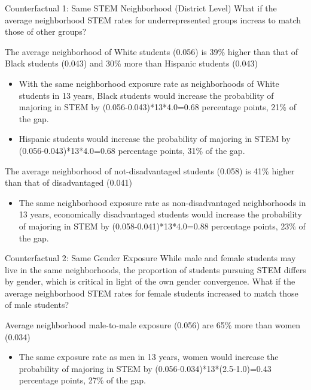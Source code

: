 \documentclass[aspectratio=169,xcolor=dvipsnames]{beamer}
\newenvironment{wideitemize}{\itemize\addtolength{\itemsep}{10pt}}{\enditemize}
\begin{document}
\begin{frame}{Counterfactual 1: Same STEM Neighborhood (District Level)}\label{counterfactual1}
What if the average neighborhood STEM rates for underrepresented groups increas to match those of other groups?
\begin{wideitemize}
    \item The average neighborhood of White students (0.056) is 39\% higher than that of Black students (0.043) and 30\% more than Hispanic students (0.043)
    \begin{itemize}
        \item With the same neighborhood exposure rate as neighborhoods of White students in 13 years, Black students would increase the probability of majoring in STEM by (0.056-0.043)*13*4.0=0.68 percentage points, 21\% of the gap. 
        \item Hispanic students would increase the probability of majoring in STEM by (0.056-0.043)*13*4.0=0.68 percentage points, 31\% of the gap. 
    \end{itemize} 
    \item The average neighborhood of not-disadvantaged students  (0.058) is 41\% higher than that of disadvantaged (0.041)
    \begin{itemize}
        \item The same neighborhood exposure rate as non-disadvantaged neighborhoods in 13 years, economically disadvantaged students would increase the probability of majoring in STEM by (0.058-0.041)*13*4.0=0.88 percentage points, 23\% of the gap.
    \end{itemize}
\end{wideitemize}
\hyperlink{counterfactual1_occ}{}
\hyperlink{counterfactual1_campus}{}
\end{frame}


\begin{frame}{Counterfactual 2: Same Gender Exposure}\label{counterfactual2}
While male and female students may live in the same neighborhoods, the proportion of students pursuing STEM differs by gender, which is critical in light of the own gender convergence.
What if the average neighborhood STEM rates for female students increased to match those of male students?
\begin{wideitemize}
    \item Average neighborhood male-to-male exposure (0.056) are 65\% more than women (0.034)
    \begin{itemize}
        \item The same exposure rate as men in 13 years, women would increase the probability of majoring in STEM by (0.056-0.034)*13*(2.5-1.0)=0.43 percentage points, 27\% of the gap. 
    \end{itemize} 
\end{wideitemize}
\hyperlink{counterfactual2_occ}{}
\end{frame}
\end{document}
